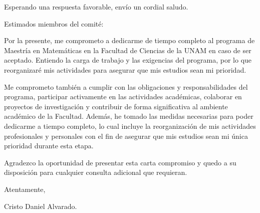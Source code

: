 \documentclass[11pt,a4paper]{moderncv}        %
\begin{document}
\date{10 de febrero de 2025}
\opening{}
\closing{Esperando una respuesta favorable, envío un cordial saludo.}

\makelettertitle

\justifying
Estimados miembros del comité:

Por la presente, me comprometo a dedicarme de tiempo completo al programa de Maestría en Matemáticas en la Facultad de Ciencias de la UNAM en caso de ser aceptado. Entiendo la carga de trabajo y las exigencias del programa, por lo que reorganizaré mis actividades para asegurar que mis estudios sean mi prioridad.

Me comprometo también a cumplir con las obligaciones y responsabilidades del programa, participar activamente en las actividades académicas, colaborar en proyectos de investigación y contribuir de forma significativa al ambiente académico de la Facultad. Además, he tomado las medidas necesarias para poder dedicarme a tiempo completo, lo cual incluye la reorganización de mis actividades profesionales y personales con el fin de asegurar que mis estudios sean mi única prioridad durante esta etapa.

Agradezco la oportunidad de presentar esta carta compromiso y quedo a su disposición para cualquier consulta adicional que requieran.

Atentamente,

Cristo Daniel Alvarado.
\end{document}
